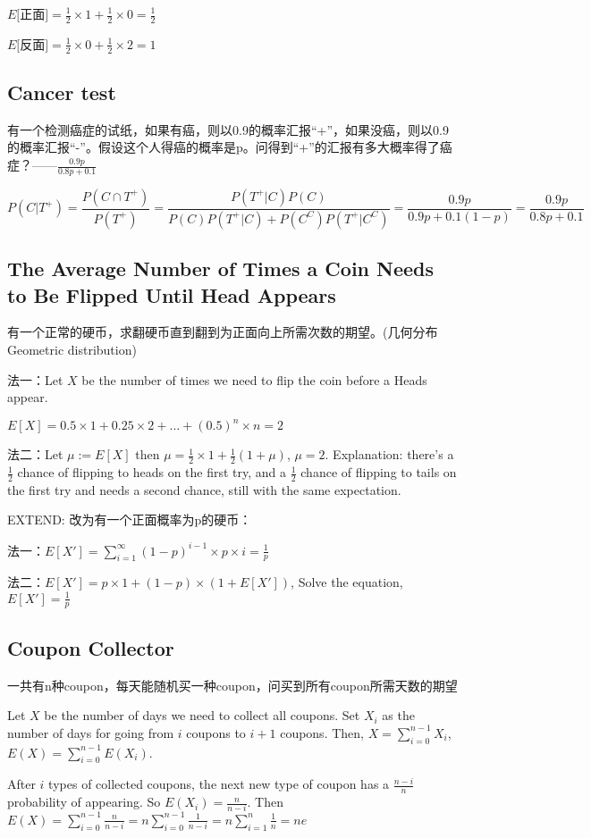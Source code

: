 \documentclass[12pt,a4paper]{ctexrep}
\begin{document}
$E[$正面$] = \frac{1}{2}\times 1 + \frac{1}{2}\times 0 = \frac{1}{2}$

$E[$反面$] = \frac{1}{2}\times 0 + \frac{1}{2}\times 2 = 1$
\subsection{Cancer test}
有一个检测癌症的试纸，如果有癌，则以0.9的概率汇报“+”，如果没癌，则以0.9的概率汇报“-”。假设这个人得癌的概率是p。问得到“+”的汇报有多大概率得了癌症？——$\frac{0.9p}{0.8p+0.1}$

\[P(C|T^+) = \frac{P(C\cap T^+)}{P(T^+)} = \frac{P(T^+|C)P(C)}{P(C)P(T^+|C)+P(C^C)P(T^+|C^C)} = \frac{0.9p}{0.9p+0.1(1-p)} = \frac{0.9p}{0.8p+0.1}\]

\subsection{The Average Number of Times a Coin Needs to Be Flipped Until Head Appears}
有一个正常的硬币，求翻硬币直到翻到为正面向上所需次数的期望。(几何分布Geometric distribution)

法一：Let $X$ be the number of times we need to flip the coin before a Heads appear.

$E[X] = 0.5\times 1 + 0.25\times 2 + \dots + (0.5)^n \times n = 2$

法二：Let $\mu := E[X]$ then $\mu = \frac{1}{2}\times 1 + \frac{1}{2}(1+\mu)$, $\mu = 2$. Explanation: there's a $\frac{1}{2}$ chance of flipping to heads on the first try, and a $\frac{1}{2}$ chance of flipping to tails on the first try and needs a second chance, still with the same expectation.

EXTEND: 改为有一个正面概率为p的硬币：

法一：$E[X'] = \sum_{i=1}^{\infty} (1-p)^{i-1} \times p \times i = \frac{1}{p}$

法二：$E[X'] = p \times 1 + (1-p) \times (1+E[X'])$, Solve the equation, $E[X'] = \frac{1}{p}$

\subsection{Coupon Collector}
一共有n种coupon，每天能随机买一种coupon，问买到所有coupon所需天数的期望

Let $X$ be the number of days we need to collect all coupons. Set $X_i$ as the number of days for going from $i$ coupons to $i+1$ coupons. Then, $X = \sum_{i=0}^{n-1} X_i$, $E(X) = \sum_{i=0}^{n-1} E(X_i)$.

After $i$ types of collected coupons, the next new type of coupon has a $\frac{n-i}{n}$ probability of appearing. So $E(X_i) = \frac{n}{n-i}$. Then $E(X) = \sum_{i=0}^{n-1} \frac{n}{n-i} = n \sum_{i=0}^{n-1}\frac{1}{n-i} = n \sum_{i=1}^{n} \frac{1}{n} = ne$
\ifdebug
\end{document}
